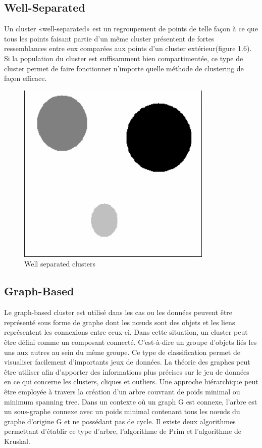 \documentclass[memoire.tex]{subfiles}
\begin{document}
\subsection{Well-Separated}
Un cluster «well-separated» est un regroupement de points de telle façon à ce que tous les points faisant partie d'un même cluster présentent de fortes ressemblances entre eux comparées aux points d'un cluster extérieur(figure 1.6). Si la population du cluster est suffisamment bien compartimentée, ce type de cluster permet de faire fonctionner n'importe quelle méthode de clustering de façon efficace.
	\begin{figure}[h!]
		\centerline{\includegraphics[scale=0.5]{img/well_separated.png}}
		\caption{Well separated clusters}
	\end{figure}

\subsection{Graph-Based}
Le graph-based cluster est utilisé dans les cas ou les données peuvent être représenté sous forme de graphe dont les nœuds sont des objets et les liens représentent les connexions entre ceux-ci. Dans cette situation, un cluster peut être défini comme un composant connecté.  C'est-à-dire un groupe d'objets liés les uns aux autres au sein du même groupe. Ce type de classification permet de visualiser facilement d'importants jeux de données.
La théorie des graphes peut être utiliser afin d’apporter des informations plus précises sur le jeu de données en ce qui concerne les clusters, cliques et outliers. Une approche hiérarchique peut être employée à travers la création d’un arbre couvrant de poids minimal ou minimum spanning tree. Dans un contexte où un graph G est connexe, l’arbre est un sous-graphe connexe avec un poids minimal contenant tous les nœuds du graphe d’origine G et ne possédant pas de cycle. Il existe deux algorithmes permettant d’établir ce type d’arbre, l’algorithme de Prim et l’algorithme de Kruskal.
\end{document}
